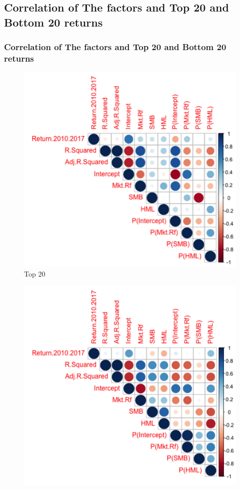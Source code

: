 \documentclass{beamer}
\begin{document}
\subsection{Correlation of The factors and Top 20 and Bottom 20 returns}
\begin{frame}
\frametitle{Correlation of The factors and Top 20 and Bottom 20 returns}

\begin{minipage}{.5\textwidth}
\begin{figure}
\centering
\includegraphics[scale=.66]{correlationfigure1.png}%
\caption{Top 20}
\end{figure}
\end{minipage}%
\begin{minipage}{.5\textwidth}
\begin{figure}
\centering
\includegraphics[scale=.6]{correlationfigure2.png}

\end{figure}
\end{minipage}
\end{frame}
\end{document}
